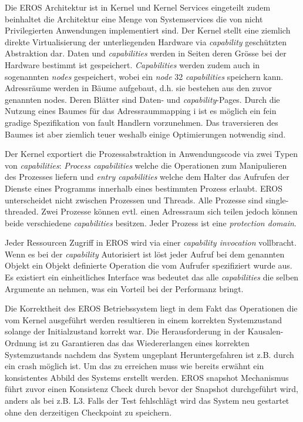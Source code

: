\documentclass[9pt,technote]{IEEEtran}
\begin{document}
        Die EROS Architektur ist in Kernel und Kernel Services eingeteilt zudem beinhaltet die Architektur eine Menge von Systemservices
        die von nicht Privilegierten Anwendungen implementiert sind.
        Der Kernel stellt eine ziemlich direkte Virtualisierung der unterliegenden Hardware via \textit{capability} gesch\"utzten Abstraktion dar.
        Daten und \textit{capabilities } werden in Seiten deren Gr\"osse bei der Hardware bestimmt ist gespeichert. 
        \textit{Capabilities} werden zudem auch in sogenannten \textit{nodes} gespeichert,
        wobei ein \textit{node} 32 \textit{capabilities} speichern kann. Adressr\"aume werden in B\"aume aufgebaut, 
        d.h. sie bestehen aus den zuvor genannten nodes. Deren Bl\"atter
        sind Daten- und \textit{capability}-Pages. Durch die Nutzung eines Baumes f\"ur das Adressraummapping i
        ist es m\"oglich ein fein gradige Spezifikation von fault Handlern vorzunehmen.
        Das traversieren des Baumes ist aber ziemlich teuer weshalb einige Optimierungen notwendig sind. 
        
        Der Kernel exportiert die Prozessabstraktion in Anwendungscode via zwei Typen von \textit{capabilities}:
        \textit{Process capabilities} welche die Operationen zum Manipulieren des Prozesses liefern und 
        \textit{entry capabilities} welche dem Halter das Aufrufen der Dienste eines Programms
        innerhalb eines bestimmten Prozess erlaubt. EROS unterscheidet nicht zwischen Prozessen und Threads. 
        Alle Prozesse sind single-threaded. Zwei Prozesse k\"onnen evtl.
        einen Adressraum sich teilen jedoch k\"onnen beide verschiedene \textit{capabilities} besitzen. 
        Jeder Prozess ist eine \textit{protection domain}.
        
        Jeder Ressourcen Zugriff in EROS wird via einer \textit{capability invocation} vollbracht. 
        Wenn es bei der \textit{capability} Autorisiert ist l\"ost jeder Aufruf
        bei dem genannten Objekt ein Objekt definierte Operation die vom Aufrufer spezifiziert wurde aus. 
        Es existiert ein einheitliches Interface was bedeutet das alle \textit{capabilities}
        die selben Argumente an nehmen, was ein Vorteil bei der Performanz bringt.
        
        Die Korrektheit des EROS Betriebssystem liegt in dem Fakt das Operationen die vom Kernel ausgef\"uhrt werden resultieren 
        in einem korrekten Systemzustand solange
        der Initialzustand korrekt war. Die Herausforderung in der Kausalen-Ordnung ist zu Garantieren das das Wiedererlangen eines 
        korrekten Systemzustands nachdem das System ungeplant 
        Heruntergefahren ist z.B. durch ein crash m\"oglich ist. Um das zu erreichen muss wie bereits erw\"ahnt ein konsistentes Abbild des Systems erstellt werden.
        EROS snapshot Mechanismus f\"uhrt zuvor einen Konsistenz Check durch bevor der Snapshot durchgef\"uhrt wird, 
        anders als bei z.B. L3. Falls der Test fehlschl\"agt 
        wird das System neu gestartet ohne den derzeitigen Checkpoint zu speichern. 
        
\end{document}
